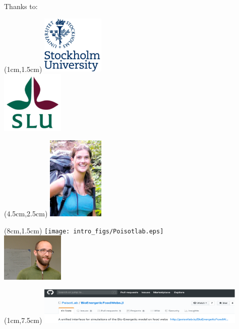 \documentclass{beamer}
\begin{document}
  \begin{frame}{Thanks to:}
      \begin{textblock*}{3cm}(1cm,1.5cm)
          \includegraphics[width=3cm]{intro_figs/SU_logo.eps} \\
          \vspace{0.2cm}
          \includegraphics[width=3cm]{intro_figs/SLU_logo.eps} 
        \end{textblock*} 

      \begin{textblock*}{4cm}(4.5cm,2.5cm)
          \includegraphics[height=4cm]{intro_figs/happyKate.eps} 
        \end{textblock*} 

      \begin{textblock*}{3cm}(8cm,1.5cm)
          \texttt{[image: intro\_figs/Poisotlab.eps]} \\
          \vspace{0.2cm}
          \includegraphics[width=3cm]{intro_figs/DBS.eps} 
        \end{textblock*} 


      \begin{textblock*}{10cm}(1cm,7.5cm)
        \includegraphics[width=10cm]{intro_figs/package.eps}
        \end{textblock*} 
    \end{frame}
\end{document}
